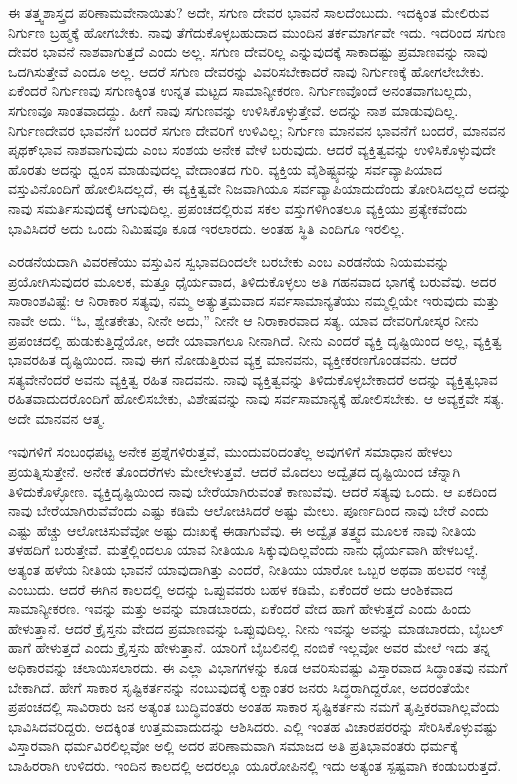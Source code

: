 ಈ ತತ್ತ್ವಶಾಸ್ತ್ರದ ಪರಿಣಾಮವೇನಾಯಿತು? ಅದೇ, ಸಗುಣ ದೇವರ ಭಾವನೆ ಸಾಲದೆಂಬುದು. ಇದಕ್ಕಿಂತ ಮೇಲಿರುವ ನಿರ್ಗುಣ ಬ್ರಹ್ಮಕ್ಕೆ ಹೋಗಬೇಕು. ನಾವು ತೆಗೆದುಕೊಳ್ಳಬಹುದಾದ ಮುಂದಿನ ತರ್ಕಮಾರ್ಗವೇ ಇದು. ಇದರಿಂದ ಸಗುಣ ದೇವರ ಭಾವನೆ ನಾಶವಾಗುತ್ತದೆ ಎಂದು ಅಲ್ಲ. ಸಗುಣ ದೇವರಿಲ್ಲ ಎನ್ನುವುದಕ್ಕೆ ಸಾಕಾದಷ್ಟು ಪ್ರಮಾಣವನ್ನು ನಾವು ಒದಗಿಸುತ್ತೇವೆ ಎಂದೂ ಅಲ್ಲ. ಆದರೆ ಸಗುಣ ದೇವರನ್ನು ವಿವರಿಸಬೇಕಾದರೆ ನಾವು ನಿರ್ಗುಣಕ್ಕೆ ಹೋಗಲೇಬೇಕು. ಏಕೆಂದರೆ ನಿರ್ಗುಣವು ಸಗುಣಕ್ಕಿಂತ ಉನ್ನತ ಮಟ್ಟದ ಸಾಮಾನ್ಯೀಕರಣ. ನಿರ್ಗುಣವೊಂದೆ ಅನಂತವಾಗಬಲ್ಲದು, ಸಗುಣವೂ ಸಾಂತವಾದದ್ದು. ಹೀಗೆ ನಾವು ಸಗುಣವನ್ನು ಉಳಿಸಿಕೊಳ್ಳುತ್ತೇವೆ. ಅದನ್ನು ನಾಶ ಮಾಡುವುದಿಲ್ಲ. ನಿರ್ಗುಣದೇವರ ಭಾವನೆಗೆ ಬಂದರೆ ಸಗುಣ ದೇವರಿಗೆ ಉಳಿವಿಲ್ಲ; ನಿರ್ಗುಣ ಮಾನವನ ಭಾವನೆಗೆ ಬಂದರೆ, ಮಾನವನ ಪೃಥಕ್​ಭಾವ ನಾಶವಾಗುವುದು ಎಂಬ ಸಂಶಯ ಅನೇಕ ವೇಳೆ ಬರುವುದು. ಆದರೆ ವ್ಯಕ್ತಿತ್ವವನ್ನು ಉಳಿಸಿಕೊಳ್ಳುವುದೇ ಹೊರತು ಅದನ್ನು ಧ್ವಂಸ ಮಾಡುವುದಲ್ಲ ವೇದಾಂತದ ಗುರಿ. ವ್ಯಕ್ತಿಯ ವೈಶಿಷ್ಟ್ಯವನ್ನು ಸರ್ವವ್ಯಾಪಿಯಾದ ವಸ್ತುವಿನೊಂದಿಗೆ ಹೋಲಿಸಿದಲ್ಲದೆ, ಈ ವ್ಯಕ್ತಿತ್ವವೇ ನಿಜವಾಗಿಯೂ ಸರ್ವವ್ಯಾಪಿಯಾದುದೆಂದು ತೋರಿಸಿದಲ್ಲದೆ ಅದನ್ನು ನಾವು ಸಮರ್ತಿಸುವುದಕ್ಕೆ ಆಗುವುದಿಲ್ಲ. ಪ್ರಪಂಚದಲ್ಲಿರುವ ಸಕಲ ವಸ್ತುಗಳಿಗಿಂತಲೂ ವ್ಯಕ್ತಿಯು ಪ್ರತ್ಯೇಕವೆಂದು ಭಾವಿಸಿದರೆ ಅದು ಒಂದು ನಿಮಿಷವೂ ಕೂಡ ಇರಲಾರದು. ಅಂತಹ ಸ್ಥಿತಿ ಎಂದಿಗೂ ಇರಲಿಲ್ಲ. 

ಎರಡನೆಯದಾಗಿ ವಿವರಣೆಯು ವಸ್ತುವಿನ ಸ್ವಭಾವದಿಂದಲೇ ಬರಬೇಕು ಎಂಬ ಎರಡನೆಯ ನಿಯಮವನ್ನು ಪ್ರಯೋಗಿಸುವುದರ ಮೂಲಕ, ಮತ್ತೂ ಧೈರ್ಯವಾದ, ತಿಳಿದುಕೊಳ್ಳಲು ಅತಿ ಗಹನವಾದ ಭಾಗಕ್ಕೆ ಬರುವೆವು. ಅದರ ಸಾರಾಂಶವಿಷ್ಟೆ: ಆ ನಿರಾಕಾರ ಸತ್ಯವು, ನಮ್ಮ ಅತ್ಯುತ್ತಮವಾದ ಸರ್ವಸಾಮಾನ್ಯತೆಯು ನಮ್ಮಲ್ಲಿಯೇ ಇರುವುದು ಮತ್ತು ನಾವೇ ಅದು. “ಓ, ಶ್ವೇತಕೇತು, ನೀನೇ ಅದು,” ನೀನೇ ಆ ನಿರಾಕಾರವಾದ ಸತ್ಯ. ಯಾವ ದೇವರಿಗೋಸ್ಕರ ನೀನು ಪ್ರಪಂಚದಲ್ಲಿ ಹುಡುಕುತ್ತಿದ್ದೆಯೋ, ಅದೇ ಯಾವಾಗಲೂ ನೀನಾಗಿದೆ. ನೀನು ಎಂದರೆ ವ್ಯಕ್ತಿ ದೃಷ್ಟಿಯಿಂದ ಅಲ್ಲ, ವ್ಯಕ್ತಿತ್ವ ಭಾವರಹಿತ ದೃಷ್ಟಿಯಿಂದ. ನಾವು ಈಗ ನೋಡುತ್ತಿರುವ ವ್ಯಕ್ತ ಮಾನವನು, ವ್ಯಕ್ತೀಕರಣಗೊಂಡವನು. ಆದರೆ ಸತ್ಯವೇನೆಂದರೆ ಅವನು ವ್ಯಕ್ತಿತ್ವ ರಹಿತ ನಾದವನು. ನಾವು ವ್ಯಕ್ತಿತ್ವವನ್ನು ತಿಳಿದುಕೊಳ್ಳಬೇಕಾದರೆ ಅದನ್ನು ವ್ಯಕ್ತಿತ್ವಭಾವ ರಹಿತವಾದುದರೊಂದಿಗೆ ಹೋಲಿಸಬೇಕು, ವಿಶೇಷವನ್ನು ನಾವು ಸರ್ವಸಾಮಾನ್ಯಕ್ಕೆ ಹೋಲಿಸಬೇಕು. ಆ ಅವ್ಯಕ್ತವೇ ಸತ್ಯ. ಅದೇ ಮಾನವನ ಆತ್ಮ. 

ಇವುಗಳಿಗೆ ಸಂಬಂಧಪಟ್ಟ ಅನೇಕ ಪ್ರಶ್ನೆಗಳಿರುತ್ತವೆ, ಮುಂದುವರಿದಂತೆಲ್ಲ ಅವುಗಳಿಗೆ ಸಮಾಧಾನ ಹೇಳಲು ಪ್ರಯತ್ನಿಸುತ್ತೇನೆ. ಅನೇಕ ತೊಂದರೆಗಳು ಮೇಲೇಳುತ್ತವೆ. ಆದರೆ ಮೊದಲು ಅದ್ವೈತದ ದೃಷ್ಟಿಯಿಂದ ಚೆನ್ನಾಗಿ ತಿಳಿದುಕೊಳ್ಳೋಣ. ವ್ಯಕ್ತಿದೃಷ್ಟಿಯಿಂದ ನಾವು ಬೇರೆಯಾಗಿರುವಂತೆ ಕಾಣುವೆವು. ಆದರೆ ಸತ್ಯವು ಒಂದು. ಆ ಏಕದಿಂದ ನಾವು ಬೇರೆಯಾಗಿರುವೆವೆಂದು ಎಷ್ಟು ಕಡಿಮೆ ಆಲೋಚಿಸಿದರೆ ಅಷ್ಟು ಮೇಲು. ಪೂರ್ಣದಿಂದ ನಾವು ಬೇರೆ ಎಂದು ಎಷ್ಟು ಹೆಚ್ಚು ಆಲೋಚಿಸುವೆವೋ ಅಷ್ಟು ದುಃಖಕ್ಕೆ ಈಡಾಗುವೆವು. ಈ ಅದ್ವೈತ ತತ್ತ್ವದ ಮೂಲಕ ನಾವು ನೀತಿಯ ತಳಹದಿಗೆ ಬರುತ್ತೇವೆ. ಮತ್ತೆಲ್ಲಿಂದಲೂ ಯಾವ ನೀತಿಯೂ ಸಿಕ್ಕುವುದಿಲ್ಲವೆಂದು ನಾನು ಧೈರ್ಯವಾಗಿ ಹೇಳಬಲ್ಲೆ. ಅತ್ಯಂತ ಹಳೆಯ ನೀತಿಯ ಭಾವನೆ ಯಾವುದಾಗಿತ್ತು ಎಂದರೆ, ನೀತಿಯು ಯಾರೋ ಒಬ್ಬರ ಅಥವಾ ಹಲವರ ಇಚ್ಛೆ ಎಂಬುದು. ಆದರೆ ಈಗಿನ ಕಾಲದಲ್ಲಿ ಅದನ್ನು ಒಪ್ಪುವವರು ಬಹಳ ಕಡಿಮೆ, ಏಕೆಂದರೆ ಅದು ಆಂಶಿಕವಾದ ಸಾಮಾನ್ಯೀಕರಣ. ಇವನ್ನು ಮತ್ತು ಅವನ್ನು ಮಾಡಬಾರದು, ಏಕೆಂದರೆ ವೇದ ಹಾಗೆ ಹೇಳುತ್ತದೆ ಎಂದು ಹಿಂದು ಹೇಳುತ್ತಾನೆ. ಆದರೆ ಕ್ರೈಸ್ತನು ವೇದದ ಪ್ರಮಾಣವನ್ನು ಒಪ್ಪುವುದಿಲ್ಲ. ನೀನು ಇವನ್ನು ಅವನ್ನು ಮಾಡಬಾರದು, ಬೈಬಲ್​ ಹಾಗೆ ಹೇಳುತ್ತದೆ ಎಂದು ಕ್ರೈಸ್ತನು ಹೇಳುತ್ತಾನೆ. ಯಾರಿಗೆ ಬೈಬಲಿನಲ್ಲಿ ನಂಬಿಕೆ ಇಲ್ಲವೋ ಅವರ ಮೇಲೆ ಇದು ತನ್ನ ಅಧಿಕಾರವನ್ನು ಚಲಾಯಿಸಲಾರದು. ಈ ಎಲ್ಲಾ ವಿಭಾಗಗಳನ್ನು ಕೂಡ ಆವರಿಸುವಷ್ಟು ವಿಸ್ತಾರವಾದ ಸಿದ್ಧಾಂತವು ನಮಗೆ ಬೇಕಾಗಿದೆ. ಹೇಗೆ ಸಾಕಾರ ಸೃಷ್ಟಿಕರ್ತನನ್ನು ನಂಬುವುದಕ್ಕೆ ಲಕ್ಷಾಂತರ ಜನರು ಸಿದ್ಧರಾಗಿದ್ದರೋ, ಅದರಂತೆಯೇ ಪ್ರಪಂಚದಲ್ಲಿ ಸಾವಿರಾರು ಜನ ಅತ್ಯಂತ ಬುದ್ಧಿವಂತರು ಅಂತಹ ಸಾಕಾರ ಸೃಷ್ಟಿಕರ್ತನು ನಮಗೆ ತೃಪ್ತಿಕರವಾಗಿಲ್ಲವೆಂದು ಭಾವಿಸಿದವರಿದ್ದರು. ಅದಕ್ಕಿಂತ ಉತ್ತಮವಾದುದನ್ನು ಆಶಿಸಿದರು. ಎಲ್ಲಿ ಇಂತಹ ವಿಚಾರಪರರನ್ನು ಸೇರಿಸಿಕೊಳ್ಳುವಷ್ಟು ವಿಸ್ತಾರವಾಗಿ ಧರ್ಮವಿರಲಿಲ್ಲವೋ ಅಲ್ಲಿ ಅದರ ಪರಿಣಾಮವಾಗಿ ಸಮಾಜದ ಅತಿ ಪ್ರತಿಭಾವಂತರು ಧರ್ಮಕ್ಕೆ ಬಾಹಿರರಾಗಿ ಉಳಿದರು. ಇಂದಿನ ಕಾಲದಲ್ಲಿ ಅದರಲ್ಲೂ ಯೂರೋಪಿನಲ್ಲಿ ಇದು ಅತ್ಯಂತ ಸ್ಪಷ್ಟವಾಗಿ ಕಂಡುಬರುತ್ತದೆ. 

